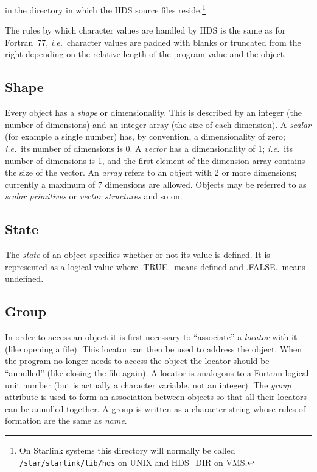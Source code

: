in the directory in which the HDS source files reside.\footnote{On Starlink
systems this directory will normally be called {\tt /star/starlink/lib/hds} on
UNIX and HDS\_DIR on VMS.}

The rules by which character values are handled by HDS is the same as for
Fortran~77, {\em i.e.}\ character values are padded with blanks or truncated
from the right depending on the relative length of the program value and the
object. 

\subsection{Shape}

Every object has a {\em shape} or dimensionality. This is described by an
integer (the number of dimensions) and an integer array (the size of each
dimension). A {\em scalar} (for example a single number) has, by convention, a
dimensionality of zero; {\em i.e.}\ its number of dimensions is 0. A {\em
vector} has a dimensionality of 1; {\em i.e.}\ its number of dimensions is 1,
and the first element of the dimension array contains the size of the vector.
An {\em array} refers to an object with 2 or more dimensions; currently a
maximum of 7 dimensions are allowed. Objects may be referred to as {\em scalar
primitives} or {\em vector structures} and so on. 

\subsection{State}

The {\em state} of an object specifies whether or not its value is defined. It
is represented as a logical value where .TRUE.\ means defined and .FALSE.\
means undefined. 

\subsection{Group}

In order to access an object it is first necessary to ``associate'' a {\em
locator} with it (like opening a file). This locator can then be used to
address the object. When the program no longer needs to access the object the
locator should be ``annulled'' (like closing the file again). A locator is
analogous to a Fortran logical unit number (but is actually a character
variable, not an integer). The {\em group} attribute is used to form an
association between objects so that all their locators can be annulled
together. A group is written as a character string whose rules of formation are
the same as {\em name}. 

